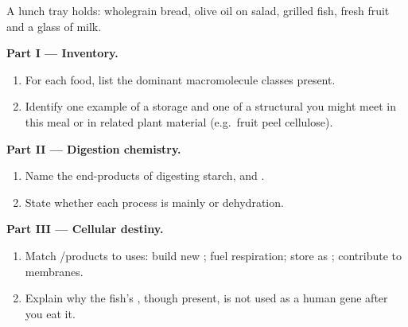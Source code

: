 \begin{problem}
\label{pb:g10:molecules-of-life:1}
A lunch tray holds: wholegrain bread, olive oil on salad, grilled fish,
fresh fruit and a glass of milk.

\medskip
\noindent\textbf{Part I --- Inventory.}
\begin{enumerate}
  \item For each food, list the dominant macromolecule classes present.
  \item Identify one example of a storage  and one of a
        structural  you might meet in this meal or in
        related plant material (e.g.\ fruit peel cellulose).
\end{enumerate}

\medskip
\noindent\textbf{Part II --- Digestion chemistry.}
\begin{enumerate}
  \item Name the  end-products of digesting starch,  and
         .
  \item State whether each process is mainly  or dehydration.
\end{enumerate}

\medskip
\noindent\textbf{Part III --- Cellular destiny.}
\begin{enumerate}
  \item Match /products to uses: build new ; fuel
        respiration; store as ; contribute to membranes.
  \item Explain why the fish's , though present, is not used as a
        human gene after you eat it.
\end{enumerate}
\end{problem}
